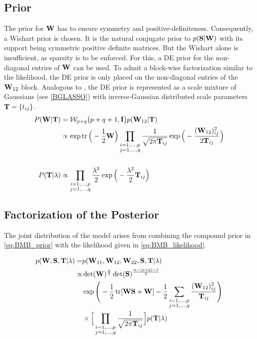 \subsection{Prior}
The prior for $\mathbf{W}$ has to ensure symmetry and positive-definiteness.
Consequently, a Wishart prior is chosen.
It is the natural conjugate prior to $p(\mathbf{S}|\mathbf{W})$ with its support being symmetric positive definite matrices.
But the Wishart alone is insufficient, as sparsity is to be enforced. 
For this, a \gls{DE} prior for the non-diagonal entries of $\mathbf{W}$ can be used.
To admit a block-wise factorization similar to the likelihood, the \gls{DE} prior is only placed on the non-diagonal entries of the $\mathbf{W}_{12}$ block.
Analogous to \citet{wang_bayesian_2012}, the \gls{DE} prior is represented as a scale mixture of Gaussians (see \autoref{BGLASSO}) with inverse-Gaussian distributed scale parameters $\mathbf{T}=\{t_{ij}\}$.
\begin{align}
\label{eq:BMB_prior}
P(\mathbf{W}|\mathbf{T}) &=
\mathcal{W}_{p+q} \big(p + q + 1, \mathbf{I}\big) p(\mathbf{W}_{12} | \mathbf{T} )
\\
&\propto \exp\operatorname{tr} \Big(-\frac{1}{2} \mathbf{W}\Big)
\prod_{{\substack{i=1,\dots,p\\j=1,\dots,q}} }   \frac{1}{\sqrt{2\pi \mathbf{T}_{ij}}} \exp 
\Big( - \frac{(\mathbf{W}_{12})_{ij}^2}{2\mathbf{T}_{ij}} \Big) 
\nonumber\\ \nonumber\\
P(\mathbf{T}| \lambda) &\propto
\prod_{{\substack{i=1,\dots,p\\j=1,\dots,q}} }   \frac{\lambda^2}{2} \exp \Big( - \frac{\lambda^2}{2} \mathbf{T}_{ij} \Big)
\nonumber
\end{align}

\subsection{Factorization of the Posterior}
The joint distribution of the model arises from combining the compound prior in \autoref{eq:BMB_prior} with the likelihood given in \autoref{eq:BMB_likelihood}.

\begin{align*}
p(\mathbf{W}, \mathbf{S}, \mathbf{T} | \lambda) =& p(\mathbf{W}_{11}, \mathbf{W}_{12}, \mathbf{W}_{22}, \mathbf{S}, \mathbf{T} | \lambda) \\
\propto &\det(\mathbf{W})^{\frac{n}{2}}  \det(\mathbf{S})^{\frac{n-(p+q)-1}{2}} 
\\
&\exp\Bigg(-\frac{1}{2} \operatorname{tr} [\mathbf{WS}+\mathbf{W}] - \frac{1}{2} \sum_{{\substack{i=1,\dots,p\\j=1,\dots,q}} } \frac{(\mathbf{W}_{12})_{ij}^2}{\mathbf{T}_{ij}}  \Bigg) 
\\
&\times \Big[\prod_{{\substack{i=1,\dots,p\\j=1,\dots,q}} }  \frac{1}{\sqrt{2\pi \mathbf{T}_{ij}}}\Big]
p(\mathbf{T}|\lambda)
\end{align*}

